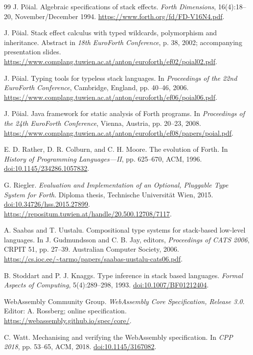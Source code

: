 \documentclass[11pt,a4paper]{article}
\begin{document}
\begin{thebibliography}{99}
J. Pöial.
\newblock Algebraic specifications of stack effects.
\newblock \emph{Forth Dimensions}, 16(4):18--20, November/December 1994.
\newblock \url{https://www.forth.org/fd/FD-V16N4.pdf}.

J. Pöial.
\newblock Stack effect calculus with typed wildcards, polymorphism and
inheritance.
\newblock Abstract in \emph{18th EuroForth Conference}, p. 38, 2002;
accompanying presentation slides.
\newblock \url{https://www.complang.tuwien.ac.at/anton/euroforth/ef02/poial02.pdf}.

J. Pöial.
\newblock Typing tools for typeless stack languages.
\newblock In \emph{Proceedings of the 22nd EuroForth Conference},
Cambridge, England, pp. 40--46, 2006.
\newblock \url{https://www.complang.tuwien.ac.at/anton/euroforth/ef06/poial06.pdf}.

J. Pöial.
\newblock Java framework for static analysis of Forth programs.
\newblock In \emph{Proceedings of the 24th EuroForth Conference},
Vienna, Austria, pp. 20--23, 2008.
\newblock \url{https://www.complang.tuwien.ac.at/anton/euroforth/ef08/papers/poial.pdf}.

E. D. Rather, D. R. Colburn, and C. H. Moore.
\newblock The evolution of Forth.
\newblock In \emph{History of Programming Languages---II}, pp. 625--670,
ACM, 1996.
\newblock \href{https://doi.org/10.1145/234286.1057832}{doi:10.1145/234286.1057832}.

G. Riegler.
\newblock \emph{Evaluation and Implementation of an Optional, Pluggable Type
System for Forth}.
\newblock Diploma thesis, Technische Universit\"at Wien, 2015.
\newblock \href{https://doi.org/10.34726/hss.2015.27899}{doi:10.34726/hss.2015.27899}.
\newblock \url{https://repositum.tuwien.at/handle/20.500.12708/7117}.

A. Saabas and T. Uustalu.
\newblock Compositional type systems for stack-based low-level languages.
\newblock In J. Gudmundsson and C. B. Jay, editors,
\emph{Proceedings of CATS 2006}, CRPIT 51, pp. 27--39.
Australian Computer Society, 2006.
\newblock \url{https://cs.ioc.ee/~tarmo/papers/saabas-uustalu-cats06.pdf}.

B. Stoddart and P. J. Knaggs.
\newblock Type inference in stack based languages.
\newblock \emph{Formal Aspects of Computing}, 5(4):289--298, 1993.
\newblock \href{https://doi.org/10.1007/BF01212404}{doi:10.1007/BF01212404}.

WebAssembly Community Group.
\newblock \emph{WebAssembly Core Specification, Release 3.0}.
\newblock Editor: A. Rossberg; online specification.
\newblock \url{https://webassembly.github.io/spec/core/}.

C. Watt.
\newblock Mechanising and verifying the WebAssembly specification.
\newblock In \emph{CPP 2018}, pp. 53--65, ACM, 2018.
\newblock \href{https://doi.org/10.1145/3167082}{doi:10.1145/3167082}.

\end{thebibliography}
\end{document}
